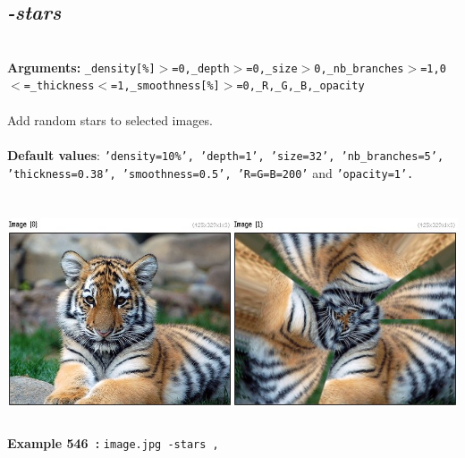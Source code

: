 \documentclass[a4paper,11pt,twoside]{book}
\begin{document}
\subsection{\emph{-stars} }\vspace*{-0.5em}
~\\\textbf{Arguments: } 
{\small \texttt{\_density[\%]$>$=0,\_depth$>$=0,\_size$>$0,\_nb\_branches$>$=1,0$<$=\_thickness$<$=1,\_smoothness[\%]$>$=0,\_R,\_G,\_B,\_opacity}}\\~\\
Add random stars to selected images.
~\\~\\\textbf{Default values}: {\small \texttt{'density=10\%', 'depth=1', 'size=32', 'nb\_branches=5', 'thickness=0.38', 'smoothness=0.5', 'R=G=B=200'} and \texttt{'opacity=1'.}}
\begin{center}\includegraphics[keepaspectratio=true,height=7cm,width=\textwidth]{img/gmic_def546.jpg}\\
{\footnotesize \textbf{Example 546~:} \texttt{image.jpg -stars ,}}
\end{center}
\end{document}
